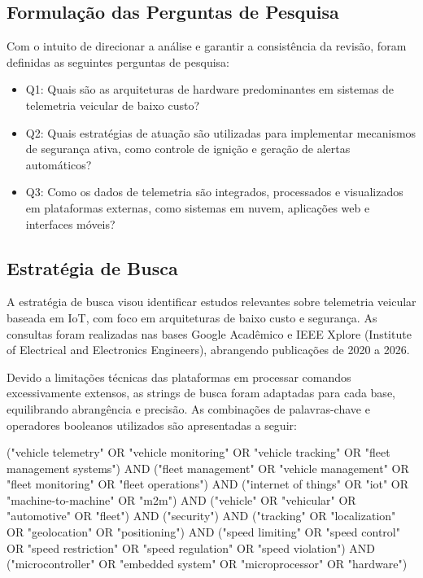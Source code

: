\documentclass[
	article,			%
	11pt,				%
	oneside,			%
	a4paper,			%
	english,			%
	brazil,				%
	sumario=tradicional
	]{abntex2}
\begin{document}
\subsection{Formulação das Perguntas de Pesquisa}

Com o intuito de direcionar a análise e garantir a consistência da revisão, foram definidas as seguintes perguntas de pesquisa:

\begin{itemize}
   \item Q1: Quais são as arquiteturas de hardware predominantes em sistemas de telemetria veicular de baixo custo?
   \item Q2: Quais estratégias de atuação são utilizadas para implementar mecanismos de segurança ativa, como controle de ignição e geração de alertas automáticos?
   \item Q3: Como os dados de telemetria são integrados, processados e visualizados em plataformas externas, como sistemas em nuvem, aplicações web e interfaces móveis?
\end{itemize}

\subsection{Estratégia de Busca}

A estratégia de busca visou identificar estudos relevantes sobre telemetria veicular baseada em IoT, com foco em arquiteturas de baixo custo e segurança. As consultas foram realizadas nas bases Google Acadêmico e IEEE Xplore (Institute of Electrical and Electronics Engineers), abrangendo publicações de 2020 a 2026.

Devido a limitações técnicas das plataformas em processar comandos excessivamente extensos, as strings de busca foram adaptadas para cada base, equilibrando abrangência e precisão. As combinações de palavras-chave e operadores booleanos utilizados são apresentadas a seguir:

\begin{tcolorbox}[title=String de busca — Google Acadêmico]
   ("vehicle telemetry" OR "vehicle monitoring" OR "vehicle tracking" OR
   "fleet management systems")
   AND ("fleet management" OR "vehicle management" OR "fleet monitoring"
   OR "fleet operations")
   AND ("internet of things" OR "iot" OR "machine-to-machine" OR "m2m")
   AND ("vehicle" OR "vehicular" OR "automotive" OR "fleet")
   AND ("security")
   AND ("tracking" OR "localization" OR "geolocation" OR "positioning")
   AND ("speed limiting" OR "speed control" OR "speed restriction"
   OR "speed regulation" OR "speed violation")
   AND ("microcontroller" OR "embedded system" OR "microprocessor"
   OR "hardware")
\end{tcolorbox}
\end{document}
